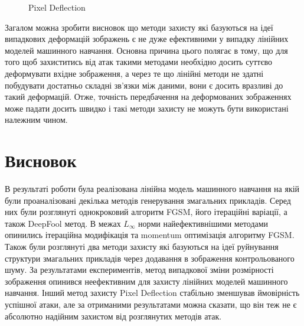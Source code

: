 \documentclass[a4paper,14pt]{extreport}
\begin{document}
\begin{figure}[!htb]
		\endminipage\hfill
		\caption{Pixel Deflection}
		\label{fig:pixeldeflection}
	\end{figure}
	
	Загалом можна зробити висновок що методи захисту які базуються на ідеї випадкових деформацій зображень є не дуже ефективними у випадку лінійних моделей машинного навчання. Основна причина цього полягає в тому, що для того щоб захиститись від атак такими методами необхідно досить суттєво деформувати вхідне зображення, а через те що лінійні методи не здатні побудувати достатньо складні зв'язки між даними, вони є досить вразливі до такий деформацій. Отже, точність передбачення на деформованих зображеннях може падати досить швидко і такі методи захисту не можуть бути використані належним чином.

	\chapter{Висновок} 
	
	В результаті роботи була реалізована лінійна модель машинного навчання на якій були проаналізовані декілька методів генерування змагальних прикладів. Серед них були розглянуті однокроковий алгоритм FGSM, його ітераційні варіації, а також DeepFool метод. В межах $L_{\infty}$ норми найефективнішими методами опинились ітераційна модифікація та momentum оптимізація алгоритму FGSM. Також були розглянуті два методи захисту які базуються на ідеї руйнування структури змагальних прикладів через додавання в зображення контрольованого шуму. За результатами експериментів, метод випадкової зміни розмірності зображення опинився неефективним для захисту лінійних моделей машинного навчання. Інший метод захисту Pixel Deflection стабільно зменшував ймовірність успішної атаки, але за отриманими результатами можна сказати, що він теж не є абсолютно надійним захистом від розглянутих методів атак.
	

	\nocite{goodfellow2014explaining}
	\nocite{kurakin2016adversarial}
	\nocite{moosavidezfooli2015deepfool}
	\nocite{dong2017boosting}
	\nocite{dong2019benchmarking}
	\nocite{yuan2017adversarial}
	\nocite{kurakin2018adversarial}
	\nocite{naseer2018local}
	\nocite{santhanam2018defending}
	\nocite{prakash2018deflecting}
	\printbibliography[title={Бібліографія}]
\end{document}
